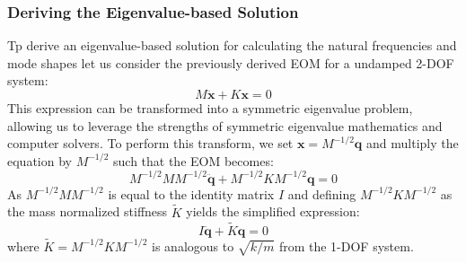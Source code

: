 \documentclass[12pt,letter]{article}
\numberwithin{ex}{section} %
\numberwithin{re}{section} %
\begin{document}
\subsubsection{Deriving the Eigenvalue-based Solution}
 
Tp derive an eigenvalue-based solution for calculating the natural frequencies and mode shapes let us consider the previously derived EOM for a undamped 2-DOF system:
\begin{equation}
M\mathbf{\ddot{x}} + K\mathbf{x} =0
\end{equation}
This expression can be transformed into a symmetric eigenvalue problem, allowing us to leverage the strengths of symmetric eigenvalue mathematics and computer solvers. To perform this transform, we set $\mathbf{x}=M^{-1/2}\mathbf{q}$ and multiply the equation by $M^{-1/2}$ such that the EOM becomes:
\begin{equation}
M^{-1/2}MM^{-1/2}\mathbf{\ddot{q}} + M^{-1/2}KM^{-1/2}\mathbf{q} =0
\end{equation}
As $M^{-1/2}MM^{-1/2}$ is equal to the identity matrix $I$ and defining $M^{-1/2}KM^{-1/2}$ as the mass normalized stiffness $\widetilde{K}$ yields the simplified expression:
\begin{equation}
I\mathbf{\ddot{q}} + \widetilde{K}\mathbf{q} =0
\end{equation}
where $\widetilde{K}=M^{-1/2}KM^{-1/2}$ is analogous to $\sqrt{k/m}$ from the 1-DOF system. 
\end{document}
